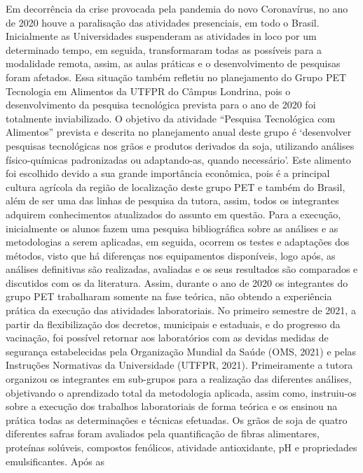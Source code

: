 Em decorrência da crise provocada pela pandemia do novo Coronavírus, no ano de 2020 houve a 
paralisação das atividades presenciais, em todo o Brasil. Inicialmente as Universidades 
suspenderam as atividades in loco por um determinado tempo, em seguida, transformaram todas 
as possíveis para a modalidade remota, assim, as aulas práticas e o desenvolvimento de pesquisas 
foram afetados. Essa situação também refletiu no planejamento do Grupo PET Tecnologia em 
Alimentos da UTFPR do Câmpus Londrina, pois o desenvolvimento da pesquisa tecnológica 
prevista para o ano de 2020 foi totalmente inviabilizado. O objetivo da atividade “Pesquisa 
Tecnológica com Alimentos” prevista e descrita no planejamento anual deste grupo é 
‘desenvolver pesquisas tecnológicas nos grãos e produtos derivados da soja, utilizando análises 
físico-químicas padronizadas ou adaptando-as, quando necessário’. Este alimento foi escolhido 
devido a sua grande importância econômica, pois é a principal cultura agrícola da região de 
localização deste grupo PET e também do Brasil, além de ser uma das linhas de pesquisa da 
tutora, assim, todos os integrantes adquirem conhecimentos atualizados do assunto em questão. 
Para a execução, inicialmente os alunos fazem uma pesquisa bibliográfica sobre as análises e as 
metodologias a serem aplicadas, em seguida, ocorrem os testes e adaptações dos métodos, visto 
que há diferenças nos equipamentos disponíveis, logo após, as análises definitivas são realizadas, 
avaliadas e os seus resultados são comparados e discutidos com os da literatura. Assim, durante o 
ano de 2020 os integrantes do grupo PET trabalharam somente na fase teórica, não obtendo a 
experiência prática da execução das atividades laboratoriais. No primeiro semestre de 2021, a 
partir da flexibilização dos decretos, municipais e estaduais, e do progresso da vacinação, foi 
possível retornar aos laboratórios com as devidas medidas de segurança estabelecidas pela 
Organização Mundial da Saúde (OMS, 2021) e pelas Instruções Normativas da Universidade 
(UTFPR, 2021). Primeiramente a tutora organizou os integrantes em sub-grupos para a 
realização das diferentes análises, objetivando o aprendizado total da metodologia aplicada, 
assim como, instruiu-os sobre a execução dos trabalhos laboratoriais de forma teórica e os 
ensinou na prática todas as determinações e técnicas efetuadas. Os grãos de soja de quatro 
diferentes safras foram avaliados pela quantificação de fibras alimentares, proteínas solúveis, 
compostos fenólicos, atividade antioxidante, pH e propriedades emulsificantes. Após as 
